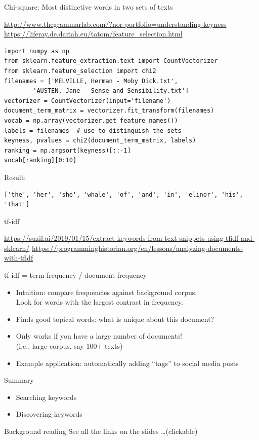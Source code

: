 \documentclass[aspectratio=169,usenames,dvipsnames]{beamer}
\begin{document}
\begin{frame}[fragile]{Chi-square: Most distinctive words in two sets of texts}
    \begin{reference}
        \url{http://www.thegrammarlab.com/?nor-portfolio=understanding-keyness} \\
        \url{https://liferay.de.dariah.eu/tatom/feature_selection.html}
    \end{reference}
\begin{lstlisting}
import numpy as np
from sklearn.feature_extraction.text import CountVectorizer
from sklearn.feature_selection import chi2
filenames = ['MELVILLE, Herman - Moby Dick.txt',
        'AUSTEN, Jane - Sense and Sensibility.txt']
vectorizer = CountVectorizer(input='filename')
document_term_matrix = vectorizer.fit_transform(filenames)
vocab = np.array(vectorizer.get_feature_names())
labels = filenames  # use to distinguish the sets
keyness, pvalues = chi2(document_term_matrix, labels)
ranking = np.argsort(keyness)[::-1]
vocab[ranking][0:10]
\end{lstlisting}
Result:
\begin{lstlisting}
['the', 'her', 'she', 'whale', 'of', 'and', 'in', 'elinor', 'his', 'that']
\end{lstlisting}
\end{frame}

\begin{frame}[fragile]{tf-idf}
\begin{reference}\scriptsize
    \url{https://suzil.ai/2019/01/15/extract-keywords-from-text-snippets-using-tfidf-and-sklearn/}
    \url{https://programminghistorian.org/en/lessons/analyzing-documents-with-tfidf}
\end{reference}
tf-idf = term frequency / document frequency

    \begin{itemize}
        \item Intuition: compare frequencies against background corpus.\\
            Look for words with the largest contrast in frequency.
        \item Finds good topical words: what is unique about this document?
        \item Only works if you have a large number of documents! \\
            (i.e., large corpus, say 100+ texts)
        \item Example application: automatically adding ``tags''
            to social media posts
    \end{itemize}
\end{frame}

\begin{frame}{Summary}
    \begin{itemize}
        \item Searching keywords
        \item Discovering keywords
    \end{itemize}
\end{frame}

\begin{frame}{Background reading}
    See all the links on the slides \dots (clickable)
\end{frame}
\end{document}

